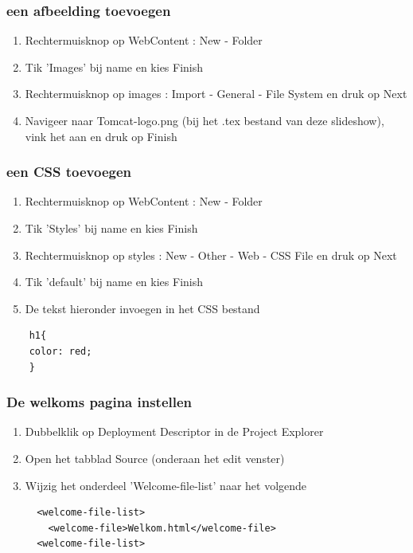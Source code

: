 \documentclass{beamer}
\begin{document}
\begin{frame}

\frametitle{een afbeelding toevoegen}

\begin{enumerate}
  \item Rechtermuisknop op WebContent : New - Folder
  \item Tik 'Images' bij name en kies Finish
  \item Rechtermuisknop op images : Import - General - File System en druk op Next
  \item Navigeer naar Tomcat-logo.png (bij het .tex bestand van deze slideshow), vink het aan en druk op Finish
\end{enumerate}

\end{frame}


\begin{frame}[fragile]

\frametitle{een CSS toevoegen}

\begin{enumerate}
  \item Rechtermuisknop op WebContent : New - Folder
  \item Tik 'Styles' bij name en kies Finish
  \item Rechtermuisknop op styles : New - Other - Web - CSS File en druk op Next
  \item Tik 'default' bij name en kies Finish
  \item De tekst hieronder invoegen in het CSS bestand
\end{enumerate}

\begin{verbatim}
    h1{ 
    color: red;
    }
\end{verbatim}

\end{frame}


\begin{frame}[fragile]

\frametitle{De welkoms pagina instellen}

\begin{enumerate}
  \item Dubbelklik op Deployment Descriptor in de Project Explorer
  \item Open het tabblad Source (onderaan het edit venster)
  \item Wijzig het onderdeel 'Welcome-file-list' naar het volgende
  \begin{verbatim}
  <welcome-file-list>
    <welcome-file>Welkom.html</welcome-file>
  <welcome-file-list>
  \end{verbatim}
\end{enumerate}

\end{frame}
\end{document}
